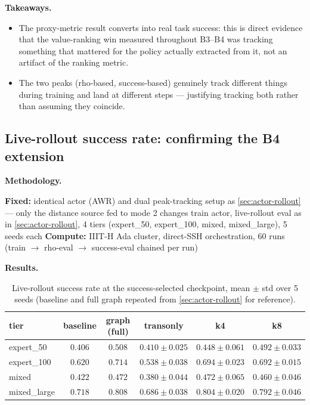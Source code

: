 \documentclass[11pt]{article}
\begin{document}
\textbf{Takeaways.}
\begin{itemize}[leftmargin=1.4em,itemsep=2pt]
\item The proxy-metric result converts into real task success: this is direct evidence that the
value-ranking win measured throughout B3--B4 was tracking something that mattered for the policy
actually extracted from it, not an artifact of the ranking metric.
\item The two peaks (rho-based, success-based) genuinely track different things during training
and land at different steps --- justifying tracking both rather than assuming they coincide.
\end{itemize}

\subsection{Live-rollout success rate: confirming the B4 extension}
\label{sec:b4ext-actor-rollout}

\textbf{Methodology.}

\begin{algorithm}[H]
\caption{B4-extension live-rollout methodology}
\begin{algorithmic}[1]
\State \textbf{Fixed:} identical actor (AWR) and dual peak-tracking setup as \cref{sec:actor-rollout} --- only the distance source fed to mode 2 changes
    \State train actor, live-rollout eval as in \cref{sec:actor-rollout}, 4 tiers (expert\_50, expert\_100, mixed, mixed\_large), 5 seeds each
\EndFor
\State \textbf{Compute:} IIIT-H Ada cluster, direct-SSH orchestration, 60 runs (train $\to$ rho-eval $\to$ success-eval chained per run)
\end{algorithmic}
\end{algorithm}

\textbf{Results.}

\begin{table}[h]
\centering
\small
\caption{Live-rollout success rate at the success-selected checkpoint, mean $\pm$ std over 5
seeds (baseline and full graph repeated from \cref{sec:actor-rollout} for reference).}
\begin{tabular}{lccccc}
\toprule
tier & baseline & graph (full) & transonly & \textbf{k4} & \textbf{k8} \\
\midrule
expert\_50   & $0.406$ & $0.508$ & $0.410 \pm 0.025$ & $0.448 \pm 0.061$ & $\mathbf{0.492 \pm 0.033}$ \\
expert\_100  & $0.620$ & $0.714$ & $0.538 \pm 0.038$ & $\mathbf{0.694 \pm 0.023}$ & $0.692 \pm 0.015$ \\
mixed        & $0.422$ & $0.472$ & $0.380 \pm 0.044$ & $\mathbf{0.472 \pm 0.065}$ & $0.460 \pm 0.046$ \\
mixed\_large & $0.718$ & $0.808$ & $0.686 \pm 0.038$ & $\mathbf{0.804 \pm 0.020}$ & $0.792 \pm 0.046$ \\
\bottomrule
\end{tabular}
\end{table}
\end{document}
